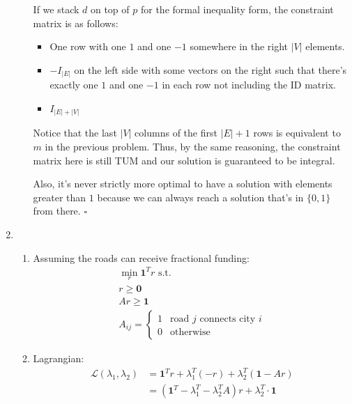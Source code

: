 \documentclass[12pt]{article}
\begin{document}
\begin{enumerate}
\begin{enumerate}
                        If we stack $d$ on top of $p$ for the formal inequality form,
                        the constraint matrix is as follows:
                        \begin{itemize}
                              \item One row with one $1$ and one $-1$ somewhere in the right $|V|$ elements.
                              \item $-I_{|E|}$ on the left side with some vectors on the right
                                    such that there's exactly one $1$ and one $-1$ in each row not including the ID matrix.
                              \item $I_{|E| + |V|}$
                        \end{itemize}

                        Notice that the last $|V|$ columns of the first $|E|+1$ rows
                        is equivalent to $m$ in the previous problem.
                        Thus, by the same reasoning, the constraint matrix
                        here is still TUM and our solution is guaranteed to be integral.

                        Also, it's never strictly more optimal to have a solution
                        with elements greater than $1$ because we can always
                        reach a solution that's in $\{0, 1\}$ from there. $\square$
            \end{enumerate}

      \pagebreak

      \item \begin{enumerate}
                  \item Assuming the roads can receive fractional funding:
                        \begin{gather*}
                              \min_{r} \mathbf{1}^Tr\text{ s.t.} \\
                              r \ge \mathbf{0} \\
                              Ar \ge \mathbf{1} \\
                              A_{ij}=\begin{cases}
                                    1 & \text{road $j$ connects city $i$} \\
                                    0 & \text{otherwise}
                              \end{cases}
                        \end{gather*}
                  \item Lagrangian:
                        \begin{align*}
                              \mathcal{L}(\lambda_1, \lambda_2)
                               & =\mathbf{1}^Tr+\lambda_1^T(-r)+\lambda_2^T(\mathbf{1}-Ar)              \\
                               & =(\mathbf{1}^T-\lambda_1^T-\lambda_2^TA)r+\lambda_2^T \cdot \mathbf{1}
                        \end{align*}


\end{enumerate}
\end{enumerate}
\end{document}
